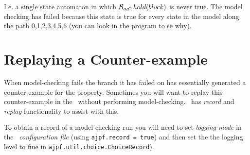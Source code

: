 I.e. a single state automaton in which $\mathrm{{\cal B}}_{ag2} \, hold(block)$ is never true.  The model checking has failed because this state is true for every state in the model along the path 0,1,2,3,4,5,6 (you can look in the program to se why).

\section{Replaying a Counter-example}
When model-checking fails the branch it has failed on has essentially generated a counter-example for the property.  Sometimes you will want to replay this counter-example in the \ail\ without performing model-checking.  \ajpf\ has \emph{record} and \emph{replay} functionality to assist with this.

To obtain a record of a model checking run you will need to set \emph{logging mode} in the \emph{\ail\ configuration file} (using \texttt{ajpf.record = true}) and then set the the logging level to fine in \texttt{ajpf.util.choice.ChoiceRecord}).

